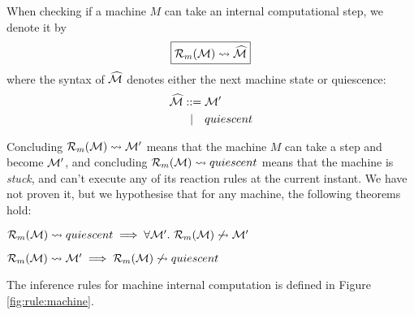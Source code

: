 When checking if a machine $M$ can take an internal computational step, we
denote it by
\begin{equation*}
\boxed{\mathcal{R}_m(\mathcal{M}) \leadsto \widehat{\mathcal{M}}}
\end{equation*}
where the syntax of $\widehat{\mathcal{M}}$ denotes either the next machine state or quiescence:
\begin{align*}
 \widehat{\mathcal{M}} ::={}& \mathcal{M}' \\
   |\quad{}& quiescent
\end{align*}

Concluding $\mathcal{R}_m(\mathcal{M}) \leadsto \mathcal{M}'$ means that the machine $M$ can take a step
and become $\mathcal{M}'$, and concluding $\mathcal{R}_m(\mathcal{M}) \leadsto quiescent$ means that the
machine is \emph{stuck}, and can't execute any of its reaction rules at the
current instant. We have not proven it, but we hypothesise that for any
machine, the following theorems hold:
\begin{theorem}
$\mathcal{R}_m(\mathcal{M}) \leadsto quiescent \implies \forall \mathcal{M}'.~ \mathcal{R}_m(\mathcal{M}) \not\leadsto \mathcal{M}'$
\end{theorem}
\begin{theorem}
$\mathcal{R}_m(\mathcal{M}) \leadsto \mathcal{M}' \implies \mathcal{R}_m(\mathcal{M}) \not\leadsto quiescent$
\end{theorem}
The inference rules for machine internal computation is defined in
Figure \ref{fig:rule:machine}.

